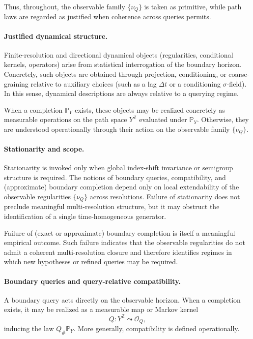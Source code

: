 \documentclass[11pt]{article}
\begin{document}
Thus, throughout, the observable family $\{\nu_Q\}$ is taken as primitive, while path laws
are regarded as justified when coherence across queries permits.

\paragraph{Justified dynamical structure.}
Finite-resolution and directional dynamical objects (regularities, conditional kernels,
operators) arise from statistical interrogation of the boundary horizon.  Concretely, such
objects are obtained through projection, conditioning, or coarse-graining relative to auxiliary
choices (such as a lag $\Delta t$ or a conditioning $\sigma$-field).  In this sense, dynamical
descriptions are always relative to a querying regime.

When a completion $\mathbb P_Y$ exists, these objects may be realized concretely as measurable
operations on the path space $Y^{\mathbb Z}$ evaluated under $\mathbb P_Y$.  Otherwise, they are
understood operationally through their action on the observable family $\{\nu_Q\}$.

\paragraph{Stationarity and scope.}
Stationarity is invoked only when global index-shift invariance or semigroup structure is
required.  The notions of boundary queries, compatibility, and (approximate) boundary
completion depend only on local extendability of the observable regularities
$\{\nu_Q\}$ across resolutions.  Failure of stationarity does not preclude meaningful
multi-resolution structure, but it may obstruct the identification of a single
time-homogeneous generator.

Failure of (exact or approximate) boundary completion is itself a meaningful empirical outcome.
Such failure indicates that the observable regularities do not admit a coherent multi-resolution
closure and therefore identifies regimes in which new hypotheses or refined queries may be
required.

\paragraph{Boundary queries and query-relative compatibility.}
A boundary query acts directly on the observable horizon.  When a completion exists, it may be
realized as a measurable map or Markov kernel
\[
Q : Y^{\mathbb Z} \leadsto \mathcal O_Q,
\]
inducing the law $Q_\# \mathbb P_Y$.  More generally, compatibility is defined operationally.
\end{document}
